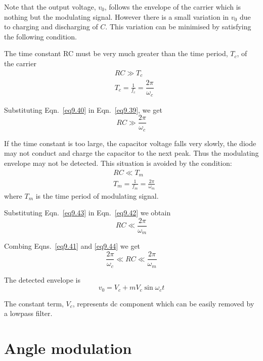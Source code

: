 Note that the output voltage, $v_{0}$, follows the envelope of the carrier which is nothing but the modulating signal. However there is a small variation in $v_{0}$ due to charging and discharging of $C$. This variation can be minimised by satisfying the following condition.

The time constant RC must be very much greater than the time period, $T_{c}$, of the carrier
\begin{align}
& RC\gg T_{c}\label{eq9.39}\\
& T_{c}=\frac{1}{f_{c}}=\dfrac{2\pi}{\omega_{c}}\label{eq9.40}
\end{align}

Substituting Eqn.~\eqref{eq9.40} in Eqn.~\eqref{eq9.39}, we get
\begin{equation}
RC\gg \dfrac{2\pi}{\omega_{c}}\label{eq9.41}
\end{equation}

If the time constant is too large, the capacitor voltage falls very slowly, the diode may not conduct and charge the capacitor to the next peak. Thus the modulating envelope may not be detected. This situation is avoided by the condition:
\begin{align}
& RC \ll T_{m}\label{eq9.42}\\[3pt]
& T_{m}=\frac{1}{f_{m}}=\frac{2\pi}{\omega_{m}}\label{eq9.43}
\end{align}
where $T_{m}$ is the time period of modulating signal.

Substituting Eqn.~\eqref{eq9.43} in Eqn.~\eqref{eq9.42} we obtain
\begin{equation}
RC\ll \frac{2\pi}{\omega_{m}}\label{eq9.44}
\end{equation}

Combing Eqns.~\eqref{eq9.41} and \eqref{eq9.44} we get
\begin{equation}
\frac{2\pi}{\omega_{c}}\ll RC\ll \frac{2\pi}{\omega_{m}}\label{eq9.45}
\end{equation}

The detected envelope is
\begin{equation}
v_{0}=V_{c}+mV_{c}\sin \omega_{c}t\label{eq9.46}
\end{equation}

The constant term, $V_{c}$, represents dc component which can be easily removed by a lowpass filter.

\section{Angle modulation}\label{sec9.17}

